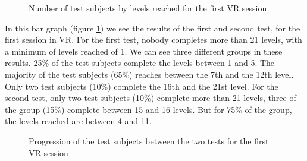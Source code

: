 \documentclass[12pt, openany, twocolumn]{article}
\begin{document}
                \begin{figure}[H]
                    \centering
                    \setlength{\fboxsep}{0pt}
                    \caption{Number of test subjects by levels reached for the first VR session}
                    \label{figure4}
                \end{figure}

            In this bar graph (figure \ref{figure4}) we see the results of the first and second test, for the first session in VR.
            For the first test, nobody completes more than 21 levels, with a minimum of levels reached of 1.
            We can see three different groups in these results.
            25\% of the test subjects complete the levels between 1 and 5.
            The majority of the test subjects (65\%) reaches between the 7th and the 12th level.
            Only two test subjects (10\%) complete the 16th and the 21st level.
            For the second test, only two test subjects (10\%) complete more than 21 levels, three of the group (15\%) complete between 15 and 16 levels. 
            But for 75\% of the group, the levels reached are between 4 and 11.
            \\

                \begin{figure}[H]
                    \centering
                    \setlength{\fboxsep}{0pt}
                    \caption{Progression of the test subjects between the two tests for the first VR session}
                    \label{figure5}
                \end{figure}
\end{document}
